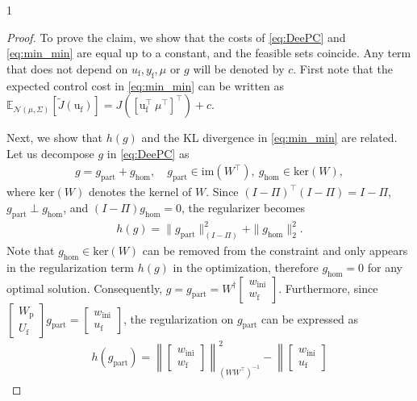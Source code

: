\documentclass[letterpaper, 10 pt, conference]{ieeeconf}
\def\wf{w_\mathrm{f}}
\def\wi{w_\mathrm{ini}}
\def\uf{u_\mathrm{f}}
\def\ufr{\mathrm{u}_\mathrm{f}}
\def\yf{y_\mathrm{f}}
\def\Wd{W}
\def\arxiv{1} %
\begin{document}
\if\arxiv1
\begin{proof}
    To prove the claim, we show that the costs of \eqref{eq:DeePC} and \eqref{eq:min_min} are equal up to a constant, and the feasible sets coincide. 
    Any term that does not depend on $\uf,\yf,\mu$ or $g$ will be denoted by $c$.
    First note that the expected control cost in \eqref{eq:min_min} can be written as
    $\mathbb{E}_{\mathcal{N}(\mu,\Sigma)}[\tilde{J}(\ufr)] = J([\ufr^\top~\mu^\top]^\top) + c$.
    
    Next, we show that $h(g)$ and the \gls{KL} divergence in \eqref{eq:min_min} are related.
    Let us decompose $g$ in \eqref{eq:DeePC} as
    \begin{align*}
        g = g_\mathrm{part} + g_\mathrm{hom},\quad g_\mathrm{part} \in \mathrm{im}(\Wd^\top),~ g_\mathrm{hom}\in \mathrm{ker}(\Wd),
    \end{align*} 
    where $\mathrm{ker}(\Wd)$ denotes the kernel of $\Wd$.
    Since $(I-\Pi)^\top(I-\Pi) = I-\Pi$, $g_\mathrm{part} \perp g_\mathrm{hom}$, and $(I-\Pi)g_\mathrm{hom} = 0$, the regularizer becomes
    \begin{align*}
        h(g) = \|g_\mathrm{part}\|_{(I-\Pi)}^2 + \|g_\mathrm{hom}\|_2^2.
    \end{align*}
    Note that $g_\mathrm{hom}\in\mathrm{ker}(W)$ can be removed from the constraint and only appears in the regularization term $h(g)$ in the optimization, therefore $g_\mathrm{hom} = 0$ for any optimal solution.
    Consequently, $g = g_\mathrm{part} = \Wd^\dagger \begin{bmatrix}
        \wi \\ \wf
    \end{bmatrix}$. 
    Furthermore, since $\begin{bmatrix}
        W_\mathrm{p} \\ U_\mathrm{f} 
    \end{bmatrix}g_\mathrm{part} = \begin{bmatrix}
        \wi \\\uf
    \end{bmatrix}$, the regularization on $g_\mathrm{part}$ can be expressed as
    \small
    \begin{align*}
        h(g_\mathrm{part}) = \left\|\begin{bmatrix}
            \wi \\ \wf
        \end{bmatrix}\right\|_{(\Wd\Wd^\top)^{-1}}^2 - \left\| \begin{bmatrix}
        \wi \\\uf

\end{bmatrix}
\end{align*}
\end{proof}
\end{document}
